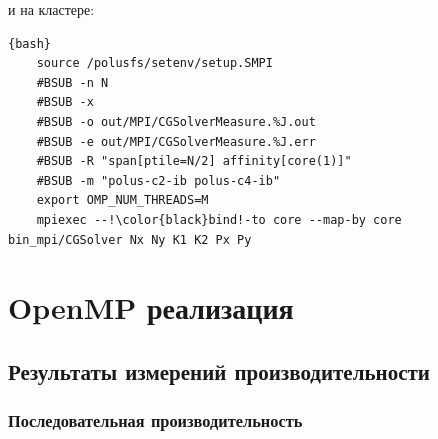 \documentclass[12pt, a4paper]{article}
\begin{document}
и на кластере:

\begin{lstlisting}[escapechar=!]{bash}
	source /polusfs/setenv/setup.SMPI
	#BSUB -n N
	#BSUB -x
	#BSUB -o out/MPI/CGSolverMeasure.%J.out
	#BSUB -e out/MPI/CGSolverMeasure.%J.err
	#BSUB -R "span[ptile=N/2] affinity[core(1)]"
	#BSUB -m "polus-c2-ib polus-c4-ib"
	export OMP_NUM_THREADS=M
	mpiexec --!\color{black}bind!-to core --map-by core bin_mpi/CGSolver Nx Ny K1 K2 Px Py
\end{lstlisting}

\newpage

\section{OpenMP реализация}


\subsection{Результаты измерений производительности}

\subsubsection{Последовательная производительность}
\end{document}
